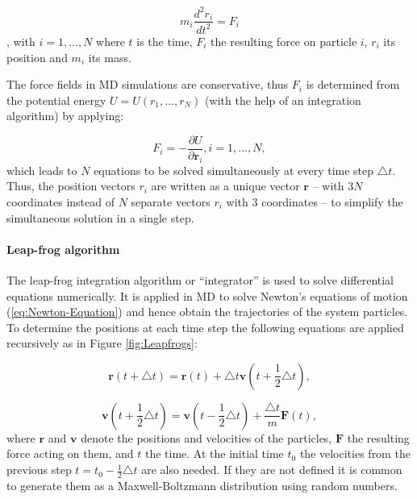 \begin{equation} \label{eq:Newton-Equation} m_{i}\frac{d^{2} {r}_{i}}{d t^{2}} = {F}_{i} \end{equation}, with $i=1,...,N$ 
where $t$ is the time, ${F}_{i}$ the resulting force on particle
$i$, ${r}_{i}$ its position and $m_{i}$ its mass.

The force fields in MD simulations are conservative, thus ${F}_{i}$
is determined from the potential energy $U=U(r_{1},...,r_{N})$ (with
the help of an integration algorithm) by applying:

\begin{equation}
{F}_{i}=-\frac{\partial U}{\partial\mathbf{r}_{i}}, i=1,...,N,\label{eq:Force-PotEnergy-derivative}
\end{equation}
which leads to $N$ equations to be solved simultaneously at every
time step $\triangle t$. Thus, the position vectors ${r}_{i}$
are written as a unique vector $\mathbf{r}$ -- with $3N$ coordinates
instead of $N$ separate vectors ${r}_{i}$ with 3 coordinates
-- to simplify the simultaneous solution in a single step.

\paragraph{Leap-frog algorithm }

The leap-frog integration algorithm or ``integrator'' is used to
solve differential equations numerically. It is applied in MD to solve
Newton's equations of motion (\ref{eq:Newton-Equation}) and hence
obtain the trajectories of the system particles. To determine the
positions at each time step the following equations are applied recursively
as in Figure \ref{fig:Leapfrogs}:

\begin{equation}
\mathbf{r}(t+\triangle t)=\mathbf{r}(t)+\triangle t\mathbf{v}(t+\frac{1}{2}\triangle t),\label{eq:leapfrog-r}
\end{equation}

\begin{equation}
\mathbf{v}(t+\frac{1}{2}\triangle t)=\mathbf{\mathbf{v}}(t-\frac{1}{2}\triangle t)+\frac{\triangle t}{m}\mathbf{F}(t),\label{eq:leapfrog-v}
\end{equation}
where $\mathbf{r}$ and $\mathbf{v}$ denote the positions and velocities
of the particles, $\mathbf{F}$ the resulting force acting on them,
and $t$ the time. At the initial time $t_{0}$ the velocities from
the previous step $t=t_{0}-\frac{1}{2}\triangle t$ are also needed.
If they are not defined it is common to generate them as a Maxwell-Boltzmann
distribution using random numbers.

